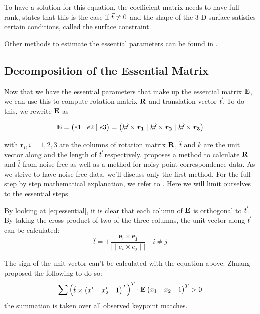 To have a solution for this equation, the coefficient matrix needs to have full rank, \cite{tekalp} states that this is the case if $\vec t \neq 0$ and the shape of the 3-D surface satisfies certain conditions, called the surface constraint.

Other methods to estimate the essential parameters can be found in \cite{tekalp}.

\subsection{Decomposition of the Essential Matrix}
Now that we have the essential parameters that make up the essential matrix $\mathbf{E}$, we can use this to compute rotation matrix $\mathbf{R}$ and translation vector $\vec t$. To do this, we rewrite $\mathbf{E}$ as 

\begin{equation} \label{eq:essential}
    \mathbf{E} = 
    \begin{pmatrix}
        e1 \mid e2 \mid e3
    \end{pmatrix} = 
    \begin{pmatrix}
        k \hat{t} \times \boldsymbol{r_1} \mid
        k \hat{t} \times \boldsymbol{r_2} \mid
        k \hat{t} \times \boldsymbol{r_3} 
    \end{pmatrix}
\end{equation}

with $\boldsymbol{r_i}, i = 1, 2, 3$ are the columns of rotation matrix $\mathbf{R}$, $\hat{t}$ and $k$ are the unit vector along and the length of $\vec t$ respectively. \cite{tekalp} proposes a method to calculate $\mathbf{R}$ and  $\hat{t}$ from noise-free as well as a method for noisy point correspondence data. As we strive to have noise-free data, we'll discuss only the first method. For the full step by step mathematical explanation, we refer to \cite{tekalp}. Here we will limit ourselves to the essential steps.\bigskip

By looking at \autoref{eq:essential}, it is clear that each column of $\mathbf{E}$ is orthogonal to $\vec t$. By taking the cross product of two of the three columns, the unit vector along $\vec t$ can be calculated:
\begin{equation}
    \hat{t} = \pm \frac{\boldsymbol{e_i \times e_j}}{\mid\mid e_i \times e_j\mid\mid}
    \quad i \neq j
\end{equation}

The sign of the unit vector can't be calculated with the equation above. Zhuang \cite{ZHUANG1989175} proposed the following to do so:
\begin{equation}
    \sum\begin{pmatrix}
        \hat{t} \times \begin{pmatrix}
            x_1' & x_2' & 1
        \end{pmatrix}^T
    \end{pmatrix}^T
    \cdot \mathbf{E}\begin{pmatrix}
        x_1 & x_2 & 1
    \end{pmatrix}^T
    > 0
\end{equation}
the summation is taken over all observed keypoint matches.\bigskip

